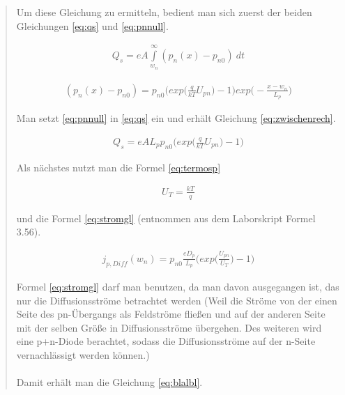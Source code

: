\begin{quote}
	Um diese Gleichung zu ermitteln, bedient man sich zuerst der beiden
	Gleichungen \ref{eq:qs} und \ref{eq:pnnull}.

	\begin{equation}
         \begin{split}
             Q_{s}=eA\int\limits_{w_{n}}^{\infty}  (p_{n}(x)-p_{n0})  \ dt
             \end{split}
         \label{eq:qs}
    \end{equation}

	\begin{equation}
         \begin{split}
             (p_{n}(x)-p_{n0})=p_{n0}\Big(exp\Big(\frac{q}{kT}U_{pn}\Big)-1\Big)exp\Big(-\frac{x-w_{n}}{L_p}\Big)
             \end{split}
         \label{eq:pnnull}
    \end{equation}

	Man setzt \ref{eq:pnnull} in \ref{eq:qs} ein und erhält Gleichung \ref{eq:zwischenrech}.

	\begin{equation}
         \begin{split}
             Q_{s}=eAL_{p}p_{n0}\Big(exp\Big(\frac{q}{kT}U_{pn}\Big)-1\Big)
             \end{split}
         \label{eq:zwischenrech}
    \end{equation}

    Als nächstes nutzt man die Formel \ref{eq:termosp}

    \begin{equation}
         \begin{split}
             U_{T}=\frac{kT}{q}
             \end{split}
         \label{eq:termosp}
    \end{equation}

	und die Formel \ref{eq:stromgl} (entnommen aus dem Laborskript Formel 3.56).

	\begin{equation}
         \begin{split}
             j_{p,Diff}(w_{n})=p_{n0}\frac{eD_{p}}{L_p}\Big(exp\Big(\frac{U_{pn}}{U_T}\Big)-1\Big)
             \end{split}
         \label{eq:stromgl}
    \end{equation}

	Formel \ref{eq:stromgl} darf man benutzen, da man davon ausgegangen ist, das
	nur die Diffusionsströme betrachtet werden (Weil die Ströme von der einen
	Seite des pn-Übergangs als Feldströme fließen und auf der anderen Seite mit
	der selben Größe in Diffusionsströme übergehen. Des weiteren wird eine p+n-Diode
	berachtet, sodass die Diffusionsströme auf der n-Seite vernachlässigt
	werden können.)\\
	\\
	Damit erhält man die Gleichung \ref{eq:blalbl}.


\end{quote}

